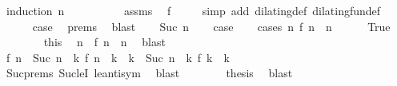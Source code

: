 \begin{isabellebody}
%
\isadelimproof
%
\endisadelimproof
%
\isatagproof
{}\isamarkupfalse%
\ {\isacharparenleft}induction\ n{\isacharparenright}\isanewline
\ \ \isamarkupfalse%
\ {}\isanewline
\ \ \ \ \isamarkupfalse%
\ assms\ \isamarkupfalse%
\ {\isacartoucheopen}f\ {}\ {\isacharequal}\ {}{\isacartoucheclose}\ \isamarkupfalse%
\ {\isacharparenleft}simp\ add{\isacharcolon}\ dilating{\isacharunderscore}def\ dilating{\isacharunderscore}fun{\isacharunderscore}def{\isacharparenright}\isanewline
\ \ \ \ \isamarkupfalse%
\ {\isacharquery}case\ \isamarkupfalse%
\ {\isachardoublequoteopen}{}{\isachardot}prems{\isachardoublequoteclose}\ \isamarkupfalse%
\ blast\isanewline
{}\isamarkupfalse%
\isanewline
\ \ \isamarkupfalse%
\ {\isacharparenleft}Suc\ n{\isacharparenright}\isanewline
\ \ \isamarkupfalse%
\ {\isacharquery}case\isanewline
\ \ \isamarkupfalse%
\ {\isacharparenleft}cases\ {\isacartoucheopen}{\isasymexists}n\ f\ n\ {\isacharequal}\ n{\isacartoucheclose}{\isacharparenright}\isanewline
\ \ \ \ \isamarkupfalse%
\ True\isanewline
\ \ \ \ \ \ \isamarkupfalse%
\ this\ \isamarkupfalse%
\ n\ \ {\isacartoucheopen}f\ n\ {\isacharequal}\ n{\isacartoucheclose}\ \isamarkupfalse%
\ blast\isanewline
\ \ \ \ \ \ \isamarkupfalse%
\ {\isacartoucheopen}f\ n\ {\isacharless}\ {\isacharparenleft}Suc\ n{\isacharparenright}\ {\isasymand}\ {\isacharparenleft}{\isasymforall}k{\isachardot}\ f\ n\ {\isacharless}\ k\ {\isasymand}\ k\ {\isasymle}\ {\isacharparenleft}Suc\ n{\isacharparenright}\ {\isasymlongrightarrow}\ {\isacharparenleft}{\isasymnexists}k\ f\ k\ {\isacharequal}\ k{\isacharparenright}{\isacharparenright}{\isacartoucheclose}\isanewline
\ \ \ \ \ \ \ \ \isamarkupfalse%
\ Suc{\isachardot}prems\ Suc{\isacharunderscore}leI\ le{\isacharunderscore}antisym\ \isamarkupfalse%
\ blast\isanewline
\ \ \ \ \ \ \isamarkupfalse%
\ {\isacharquery}thesis\ \isamarkupfalse%
\ blast\isanewline
\ \ \isamarkupfalse%
\isanewline
\ \ \ \ \isamarkupfalse%

\end{isabellebody}
